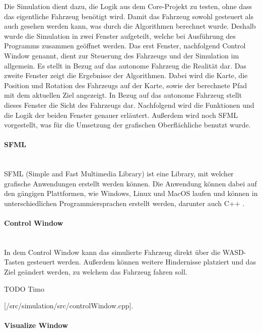 Die Simulation dient dazu, die Logik aus dem Core-Projekt zu testen, ohne dass das eigentliche Fahrzeug benötigt wird. Damit das Fahrzeug sowohl gesteuert als auch gesehen werden kann, was durch die Algorithmen berechnet wurde. Deshalb wurde die Simulation in zwei Fenster aufgeteilt, welche bei Ausführung des Programms zusammen geöffnet werden. Das erst Fenster, nachfolgend Control Window genannt, dient zur Steuerung des Fahrzeugs und der Simulation im allgemein. Es stellt in Bezug auf das autonome Fahrzeug die Realität dar. Das zweite Fenster zeigt die Ergebnisse der Algorithmen. Dabei wird die Karte, die Position und Rotation des Fahrzeugs auf der Karte, sowie der berechnete Pfad mit dem aktuellen Ziel angezeigt. In Bezug auf das autonome Fahrzeug stellt dieses Fenster die Sicht des Fahrzeugs dar. Nachfolgend wird die Funktionen und die Logik der beiden Fenster genauer erläutert. Außerdem wird noch SFML vorgestellt, was für die Umsetzung der grafischen Oberflächliche benutzt wurde. 

\paragraph{SFML} \mbox{} \\

SFML (Simple and Fast Multimedia Library) ist eine Library, mit welcher grafische Anwendungen erstellt werden können. Die Anwendung können dabei auf den gängigen Plattformen, wie Windows, Linux und MacOS laufen und können in unterschiedlichen Programmiersprachen erstellt werden, darunter auch C++ \cite{sfml}. 

\paragraph{Control Window} \mbox{} \\

In dem Control Window kann das simulierte Fahrzeug direkt über die \dq WASD\dq-Tasten gesteuert werden. Außerdem können weitere Hindernisse platziert und das Ziel geändert werden, zu welchem das Fahrzeug fahren soll. 

TODO Timo

[/src/simulation/src/controlWindow.cpp]. 

\paragraph{Visualize Window} \mbox{} \\

